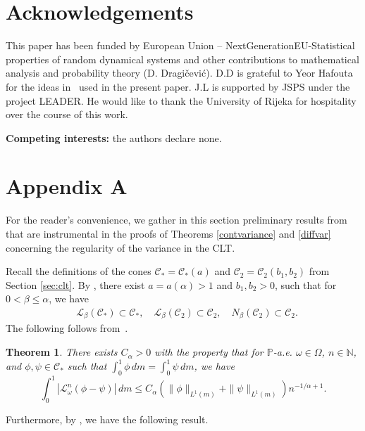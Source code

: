 \documentclass[12pt,reqno,a4paper]{article}
\newcommand\cL{{\mathcal L}}
\newcommand\cC{{\mathcal C}}
\newtheorem{theorem}{Theorem}
\begin{document}
\section*{Acknowledgements}
This paper has been funded by European Union – NextGenerationEU-Statistical properties of random dynamical systems and other contributions to mathematical analysis and probability theory (D. Dragi\v cevi\' c).  D.D  is grateful to Yeor Hafouta for the ideas in~\cite{DH2} used in the present paper.
J.L is supported by JSPS under the project LEADER. He would like to thank the University of Rijeka for hospitality over the course of this work.

\bigskip

\noindent\textbf{Competing interests:} the authors declare none.

\section{Appendix A}\label{AppA}

For the reader's convenience, we gather in this section preliminary results from \cite{DGTS} that 
are instrumental in the proofs of Theorems \ref{contvariance} and \ref{diffvar} concerning the regularity of 
the variance in the CLT.

Recall the definitions of the cones $\cC_* = \cC_*(a)$ and $\cC_2 = \cC_2(b_1, b_2)$ from Section \ref{sec:clt}. By 
\cite[Lemma 2 and Proposition 5]{DGTS}, there exist $a = a(\alpha) > 1$ and 
$b_1,b_2 > 0$,  such that for $0 < \beta \le \alpha$, we have
\begin{align}\label{cone_inv}
&\cL_{\beta}( \cC_* ) \subset \cC_*, \quad 
\cL_{\beta}( \cC_2 ) \subset \cC_2, \quad N_\beta( \cC_2 ) \subset \cC_2. 
\end{align}
The following follows from~\cite[Theorem 7]{DGTS}.
 \begin{theorem}\label{DECC}
There exists $C_\alpha>0$ with the property that for $\mathbb P$-a.e. $\omega \in \Omega$,  $n\in \mathbb N$, and $\phi, \psi \in \mathcal C_*$ such that $\int_0^1\phi\, dm=\int_0^1\psi\, dm$, we have
\begin{equation}\label{dec}
\int_0^1 | \mathcal L_\omega^n (\phi- \psi)|\, dm\le C_\alpha (\|\phi \|_{L^1(m)}+\|\psi \|_{L^1(m)})n^{-1/\alpha+1}.
\end{equation}
 \end{theorem}


Furthermore, by \cite[Lemma 12]{DGTS}, we have the following result.
\end{document}
